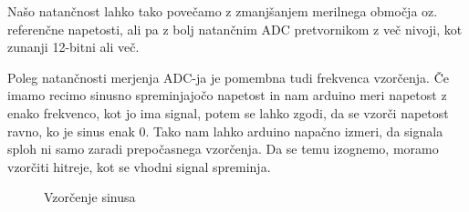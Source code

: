 \documentclass[a4paper, 12pt]{article}
\begin{document}
Našo natančnost lahko tako povečamo z zmanjšanjem merilnega območja oz. referenčne napetosti, ali pa z bolj natančnim ADC pretvornikom z več nivoji, kot zunanji 12-bitni ali več.\

Poleg natančnosti merjenja ADC-ja je pomembna tudi frekvenca vzorčenja. Če imamo recimo sinusno spreminjajočo napetost in nam arduino meri napetost z enako frekvenco, kot jo ima signal, potem se lahko zgodi, da se vzorči napetost ravno, ko je sinus enak 0. Tako nam lahko arduino napačno izmeri, da signala sploh ni samo zaradi prepočasnega vzorčenja. Da se temu izognemo, moramo vzorčiti hitreje, kot se vhodni signal spreminja.

\begin{figure}[!htbp]
	\centering
	\caption{Vzorčenje sinusa}
\end{figure}
 
\end{document}
